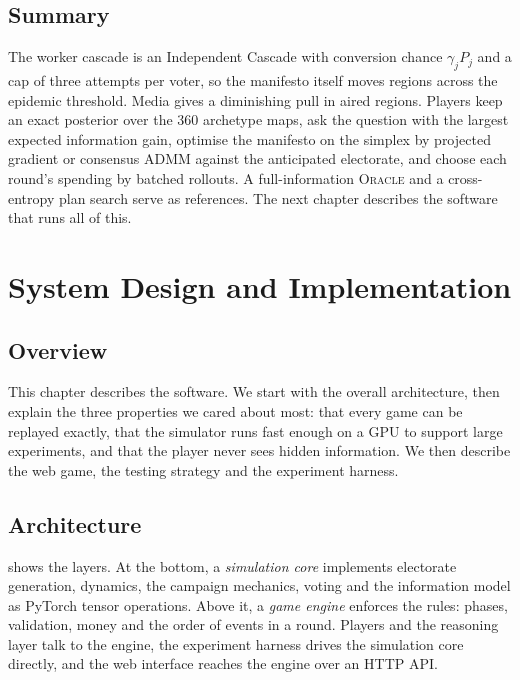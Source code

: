 \documentclass[11pt,a4paper,oneside]{report}
\newcommand{\ORACLE}{\textsc{Oracle}}
\newcommand{\overviewsection}{\section{Overview}}
\newcommand{\summarysection}{\section{Summary}}
\begin{document}
\summarysection

The worker cascade is an Independent Cascade with conversion chance $\gamma_j P_j$ and a cap of three
attempts per voter, so the manifesto itself moves regions across the epidemic threshold. Media gives a
diminishing pull in aired regions. Players keep an exact posterior over the 360 archetype maps, ask the
question with the largest expected information gain, optimise the manifesto on the simplex by projected
gradient or consensus ADMM against the anticipated electorate, and choose each round's spending by batched
rollouts. A full-information \ORACLE{} and a cross-entropy plan search serve as references. The next
chapter describes the software that runs all of this.

\chapter{System Design and Implementation}\label{ch:system}

\overviewsection

This chapter describes the software. We start with the overall architecture, then explain the three
properties we cared about most: that every game can be replayed exactly, that the simulator runs fast
enough on a GPU to support large experiments, and that the player never sees hidden information. We then
describe the web game, the testing strategy and the experiment harness.

\section{Architecture}

 shows the layers. At the bottom, a \emph{simulation core} implements electorate
generation, dynamics, the campaign mechanics, voting and the information model as PyTorch
tensor operations. Above it, a \emph{game engine} enforces the rules: phases, validation, money and the
order of events in a round. Players and the reasoning layer talk to the engine, the experiment harness
drives the simulation core directly, and the web interface reaches the engine over an HTTP API.
\end{document}
